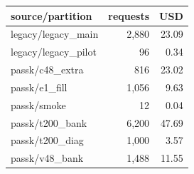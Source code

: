 \begin{tabular}{lrr}\toprule source/partition & requests & USD\\\midrule
legacy/legacy\_main & 2,880 & 23.09\\
legacy/legacy\_pilot & 96 & 0.34\\
passk/c48\_extra & 816 & 23.02\\
passk/e1\_fill & 1,056 & 9.63\\
passk/smoke & 12 & 0.04\\
passk/t200\_bank & 6,200 & 47.69\\
passk/t200\_diag & 1,000 & 3.57\\
passk/v48\_bank & 1,488 & 11.55\\
\bottomrule\end{tabular}
